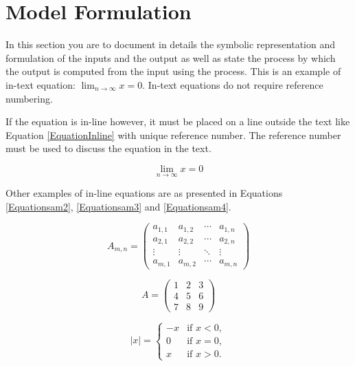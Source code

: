 \section{Model Formulation} 

In this section you are to document in details the symbolic representation and formulation of the inputs and the output as well as state the process by which the output is computed from the input using the process.
This is an example of in-text equation:
\begin{math}
\lim_{n\rightarrow \infty}x=0
\end{math}. In-text equations do not require reference numbering.

If the equation is in-line however, it must be placed on a line outside the text like Equation \ref{EquationInline} with unique reference number. The reference number must be used to discuss the equation in the text.


\begin{equation}
\lim_{n\rightarrow \infty}x=0
\label{EquationInline}
\end{equation}

Other examples of in-line equations are as presented in Equations \ref{Equationsam2}, \ref{Equationsam3} and \ref{Equationsam4}.

\begin{equation}
A_{m,n} = 
\begin{pmatrix}
a_{1,1} & a_{1,2} & \cdots & a_{1,n} \\
a_{2,1} & a_{2,2} & \cdots & a_{2,n} \\
\vdots  & \vdots  & \ddots & \vdots  \\
a_{m,1} & a_{m,2} & \cdots & a_{m,n} 
\end{pmatrix}
\label{Equationsam2}
\end{equation}



\begin{equation}
A = 
\begin{pmatrix}
1 & 2 & 3 \\
4 & 5 & 6 \\
7 & 8 & 9
\end{pmatrix}
\label{Equationsam3}
\end{equation}


\begin{equation}
|x| = \left\{
\begin{array}{rl}
-x & \text{if } x < 0,\\
0 & \text{if } x = 0,\\
x & \text{if } x > 0.
\end{array} \right.
\label{Equationsam4}
\end{equation}


